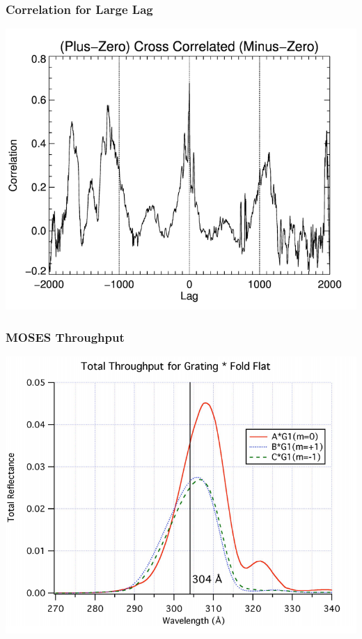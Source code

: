 \documentclass[landscape,xcolor={table},10pt]{beamer}
\begin{document}
	\begin{frame}
		\frametitle{Correlation for Large Lag}
	\includegraphics[scale=.37]{images/wishbone_long.png}
	\end{frame}
	
\begin{frame}
	\frametitle{MOSES Throughput}
	
	\includegraphics[scale=.35]{images/MOSES_throughput.png}
\end{frame}	
	
\end{document}
